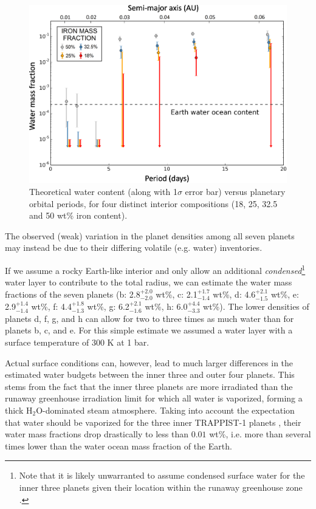 \documentclass[fleqn,usenatbib]{mnras} %
\begin{document}
\begin{figure}
    \centering
    \includegraphics[width=\hsize]{figures/figure_water_period_TTV_trim.png}
    \caption{Theoretical water content (along with 1$\sigma$ error bar) versus planetary orbital periods, for four distinct interior compositions (18, 25, 32.5 and 50 wt\% iron content).}
    \label{fig:water_vs_period}
\end{figure}

The observed (weak) variation in the planet densities among all seven planets may instead be due to their differing volatile (e.g. water) inventories. 

If we assume a rocky Earth-like interior and only allow an additional {\it condensed}\footnote{Note that it is likely unwarranted to assume condensed surface water for the inner three planets given their location within the runaway greenhouse zone \citep{Turbet2020}.} water layer to contribute to the total radius, we can estimate the water mass fractions of the seven planets 
(b: 2.8$^{+2.0}_{-2.0}$ wt\%, c: 2.1$^{+1.7}_{-1.4}$ wt\%, d: 4.6$^{+2.1}_{-1.5}$ wt\%, e: 2.9$^{+1.4}_{-1.4}$ wt\%, f: 4.4$^{+1.8}_{-1.3}$ wt\%, g: 6.2$^{+2.1}_{-1.6}$  wt\%, h: 6.0$^{+4.4}_{-3.3}$ wt\%). 
The lower densities of planets d, f, g, and h can allow for two to three times as much water than for planets b, c, and e. For this simple estimate we assumed a water layer with a surface temperature of 300 K at 1 bar. 

Actual surface conditions can, however, lead to much larger differences in the estimated water budgets between the inner three and outer four planets. This stems from the fact that the inner three planets are more irradiated than the runaway greenhouse irradiation limit \citep{Kopparapu2013,Wolf2017,Turbet2018} for which all water is vaporized, forming a thick H$_2$O-dominated steam atmosphere. Taking into account the expectation that water should be vaporized for the three inner TRAPPIST-1 planets \citep{Turbet2019,Turbet2020}, their water mass fractions drop drastically to less than $0.01$ wt\%, i.e. more than several times lower than the water ocean mass fraction of the Earth. 
\end{document}
